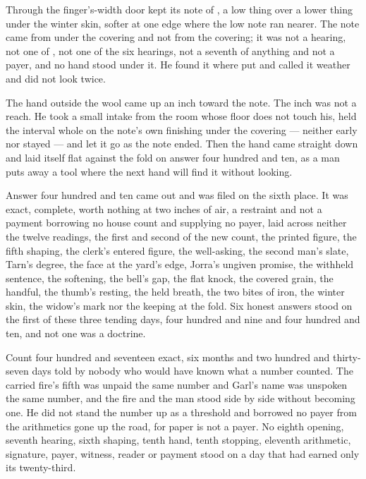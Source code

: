 Through the finger's-width door  kept its note of , a low thing over a lower thing under the winter skin, softer at one edge where the low note ran nearer. The note came from under the covering and not from the covering; it was not a hearing, not one of , not one of the six hearings, not a seventh of anything and not a payer, and no hand stood under it. He found it where put and called it weather and did not look twice.

The hand outside the wool came up an inch toward the note. The inch was not a reach. He took a small intake from the room whose floor does not touch his, held the interval whole on the note's own finishing under the covering --- neither early nor stayed --- and let it go as the note ended. Then the hand came straight down and laid itself flat against the fold on answer four hundred and ten, as a man puts away a tool where the next hand will find it without looking.

Answer four hundred and ten came out and was filed on the sixth place. It was exact, complete, worth nothing at two inches of air, a restraint and not a payment borrowing no house count and supplying no payer, laid across neither the twelve readings, the first and second of the new count, the printed figure, the fifth shaping, the clerk's entered figure, the well-asking, the second man's slate, Tarn's degree, the face at the yard's edge, Jorra's ungiven promise, the withheld sentence, the softening, the bell's gap, the flat knock, the covered grain, the handful, the thumb's resting, the held breath, the two bites of iron, the winter skin, the widow's mark nor the keeping at the fold. Six honest answers stood on the first of these three tending days, four hundred and nine and four hundred and ten, and not one was a doctrine.

Count four hundred and seventeen exact, six months and two hundred and thirty-seven days told by nobody who would have known what a number counted. The carried fire's fifth was unpaid the same number and Garl's name was unspoken the same number, and the fire and the man stood side by side without becoming one. He did not stand the number up as a threshold and borrowed no payer from the arithmetics gone up the road, for paper is not a payer. No eighth opening, seventh hearing, sixth shaping, tenth hand, tenth stopping, eleventh arithmetic, signature, payer, witness, reader or payment stood on a day that had earned only its twenty-third.

